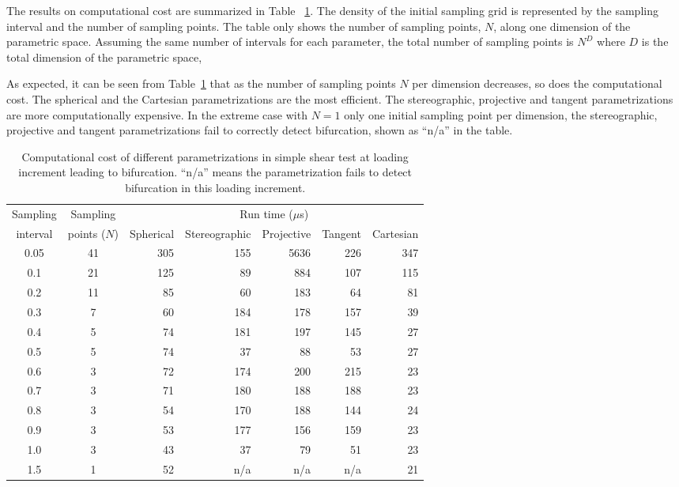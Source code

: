 \documentclass[12pt]{article}
\numberwithin{equation}{section}
\begin{document}
The results on computational cost are summarized in Table~
\ref{tab:iso_shear_runtime}. The density of the initial sampling grid
is represented by the sampling interval and the number of sampling
points. The table only shows the number of sampling points, $N$, along
one dimension of the parametric space. Assuming the same number of
intervals for each parameter, the total number of sampling points is
$N^{D}$ where $D$ is the total dimension of the parametric space,

As expected, it can be seen from Table~\ref{tab:iso_shear_runtime}
that as the number of sampling points $N$ per dimension decreases, so
does the computational cost. The spherical and the Cartesian
parametrizations are the most efficient. The stereographic, projective
and tangent parametrizations are more computationally expensive. In
the extreme case with $N=1$ \ie only one initial sampling point per
dimension, the stereographic, projective and tangent parametrizations
fail to correctly detect bifurcation, shown as ``n/a'' in the table.

\begin{table}[htbp]
  \begin{center}
    \begin{tabular}{c c | r r r r r}
      \toprule
      Sampling & Sampling & \multicolumn{5}{c}{Run time ($\mu$s)} \\
      interval & points ($N$) & Spherical & Stereographic & Projective &
      Tangent & Cartesian \\
      \midrule
      0.05 & 41 & 305 & 155 & 5636 & 226 & 347  \\
      0.1 & 21 & 125 & 89  & 884 & 107 & 115  \\
      0.2 & 11 & 85 & 60  & 183 & 64  & 81  \\
      0.3 & 7 & 60 & 184 & 178 & 157 & 39  \\
      0.4 & 5 & 74 & 181 & 197 & 145 & 27  \\
      0.5 & 5 & 74 & 37  & 88  & 53  & 27  \\
      0.6 & 3 & 72 & 174 & 200 & 215 & 23  \\
      0.7 & 3 & 71 & 180 & 188 & 188 & 23  \\
      0.8 & 3 & 54 & 170 & 188 & 144 & 24  \\
      0.9 & 3 & 53 & 177 & 156 & 159 & 23  \\
      1.0 & 3 & 43 & 37  & 79  & 51  & 23  \\
      1.5 & 1 & 52 & n/a & n/a  & n/a & 21  \\
      \bottomrule
    \end{tabular}
    \caption{Computational cost of different parametrizations in
      simple shear test at loading increment leading to bifurcation.
      ``n/a'' means the parametrization fails to detect bifurcation in
      this loading increment.}
    \label{tab:iso_shear_runtime}
  \end{center}
\end{table}
\end{document}
